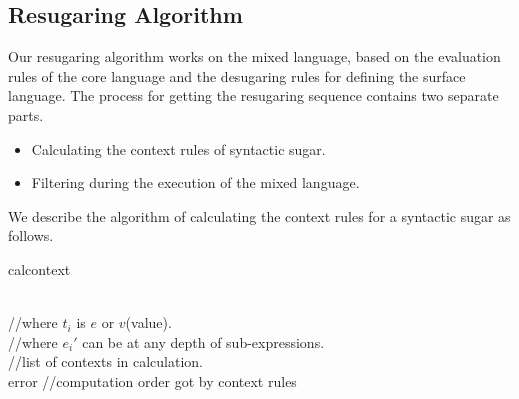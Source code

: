 \subsection{Resugaring Algorithm}

Our resugaring algorithm works on the mixed language, based on the evaluation rules of the core language and the desugaring rules for defining the surface language. The process for getting the resugaring sequence contains two separate parts.

\begin{itemize}
\item Calculating the context rules of syntactic sugar.
\item Filtering  during the execution of the mixed language.
\end{itemize}

We describe the algorithm of calculating the context rules for a syntactic sugar as follows.

\begin{algorithm}
	\caption{calcontext}
	\label{alg:f}     %
	\begin{algorithmic}[1]       %
		\REQUIRE ~~\\      %
		 //where $t_i$ is $e$ or $v$(value).\\
		 //where $e_i'$ can be at any depth of sub-expressions.\\
		 //list of contexts in calculation.
		\ENSURE ~~\\     %
		\STATE     {}
				\RETURN error
			\ELSE
				\STATE {}
				\STATE \qquad{}
			\ENDIF
		\ENDIF
		\STATE {} //computation order got by context rules
				\STATE {}
				\STATE \qquad{}
			\ELSE
				\STATE {}
				\STATE \qquad{}
				\STATE {}
				\STATE {}
			\ENDIF
		\ENDFOR
		\RETURN {}
		
	\end{algorithmic}
\end{algorithm}

